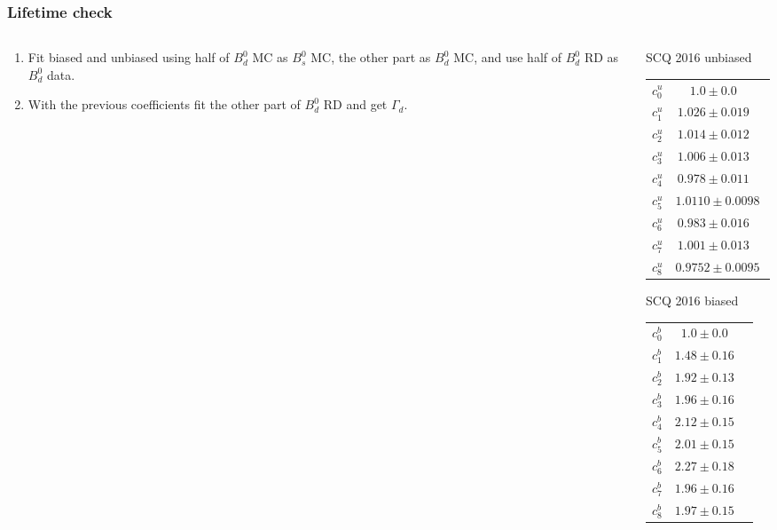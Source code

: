 \documentclass[aspectratio=43,9pt]{beamer}
\begin{document}
\begin{frame}[default] %
\frametitle{Lifetime check}

\footnotesize

\begin{columns}[T]


  \begin{column}{0.25\textwidth}
\begin{enumerate}
  \item Fit biased and unbiased using half of $B_d^0$ MC as $B_s^0$ MC, the other part  as $B_d^0$ MC, and use half of $B_d^0$ RD as $B_d^0$ data.
  \item With the previous coefficients fit the other part of $B_d^0$ RD and get $\Gamma_d$.
\end{enumerate}
  \end{column}


  \begin{column}{0.25\textwidth}
    \begin{block}{SCQ 2016 unbiased} \centering
    \begin{tabular}{ccc}
      $c_0^u$ & $1.0   \pm 0.0  $ \\
      $c_1^u$ &  $  1.026 \pm   0.019 $ \\
      $c_2^u$ &  $  1.014 \pm   0.012 $ \\
      $c_3^u$ &  $  1.006 \pm   0.013 $ \\
      $c_4^u$ &  $  0.978 \pm   0.011 $ \\
      $c_5^u$ &  $ 1.0110 \pm  0.0098 $ \\
      $c_6^u$ &  $  0.983 \pm   0.016 $ \\
      $c_7^u$ &  $  1.001 \pm   0.013 $ \\
      $c_8^u$ &  $ 0.9752 \pm  0.0095 $ \\
    \end{tabular}
    \end{block}
    \begin{block}{SCQ 2016 biased} \centering
    \begin{tabular}{ccc}
      $c_0^b$ & $1.0  \pm 0.0 $ \\
      $c_1^b$ &  $   1.48 \pm   0.16  $ \\
      $c_2^b$ &  $   1.92 \pm   0.13  $ \\
      $c_3^b$ &  $   1.96 \pm   0.16  $ \\
      $c_4^b$ &  $   2.12 \pm   0.15  $ \\
      $c_5^b$ &  $   2.01 \pm   0.15  $ \\
      $c_6^b$ &  $   2.27 \pm   0.18  $ \\
      $c_7^b$ &  $   1.96 \pm   0.16  $ \\
      $c_8^b$ &  $   1.97 \pm   0.15  $ \\
      

\end{tabular}
\end{block}
\end{column}
\end{columns}
\end{frame}
\end{document}
